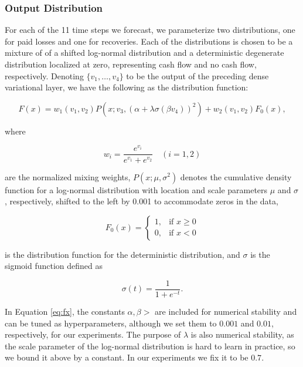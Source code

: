 \documentclass{article}
\begin{document}
\subsubsection{Output Distribution}

For each of the 11 time steps we forecast, we parameterize two distributions, one for paid losses and one for recoveries. Each of the distributions is chosen to be a mixture of of a shifted log-normal distribution and a deterministic degenerate distribution localized at zero, representing cash flow and no cash flow, respectively. Denoting $\{v_1,\dots,v_4\}$ to be the output of the preceding dense variational layer, we have the following as the distribution function:

\begin{equation} \label{eq:fx}
    F(x) = w_1(v_1, v_2)P(x; v_3, (\alpha + \lambda\sigma(\beta v_4))^2) + w_2(v_1, v_2)F_0(x),
\end{equation}

where 

\begin{equation}
    w_i = \frac{e^{v_i}}{e^{v_1} + e^{v_2}}\quad (i = 1, 2)
\end{equation}

are the normalized mixing weights, $P(x; \mu, \sigma^2)$ denotes the cumulative density function for a log-normal distribution with location and scale parameters $\mu$ and $\sigma$, respectively, shifted to the left by 0.001 to accommodate zeros in the data,

\begin{equation}
    F_{0}(x)=\left\{\begin{matrix} 1, & \mbox{if }x\ge 0 \\ 0, & \mbox{if }x<0 \end{matrix}\right.
\end{equation}

is the distribution function for the deterministic distribution, and $\sigma$ is the sigmoid function defined as

\begin{equation}
    \sigma(t) = \frac{1}{1 + e^{-t}}.
\end{equation}

In Equation \ref{eq:fx}, the constants $\alpha, \beta > $ are included for numerical stability and can be tuned as hyperparameters, although we set them to $0.001$ and $0.01$, respectively, for our experiments. The purpose of $\lambda$ is also numerical stability, as the scale parameter of the log-normal distribution is hard to learn in practice, so we bound it above by a constant. In our experiments we fix it to be $0.7$.
\end{document}
